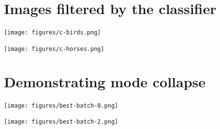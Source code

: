 \documentclass{article}
\begin{document}
\section{Images filtered by the classifier} \label{appendix:B}
\begin{center}
    \texttt{[image: figures/c-birds.png]}
\end{center}
\begin{center}
    \texttt{[image: figures/c-horses.png]}
\end{center}

\section{Demonstrating mode collapse} \label{appendix:C}
\begin{center}
    \texttt{[image: figures/best-batch-0.png]}
\end{center}
\begin{center}
    \texttt{[image: figures/best-batch-2.png]}
\end{center}

\printbibliography
\end{document}
